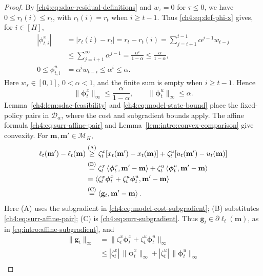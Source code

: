 \begin{proof}
By \eqref{ch4:eq:sdac-residual-definitions} and $w_\tau=0$ for $\tau\le0$,
we have $0\le r_t(i)\le r_t$, with $r_t(i)=r_t$ when $i\ge t-1$.
Thus \eqref{ch4:eq:def-phi-x} gives, for $i\in[H]$,
\[
\begin{aligned}
|\phi_{t,i}^x|
 &=|r_t(i)-r_t|=r_t-r_t(i)
   =\sum_{j=i+1}^{t-1}\alpha^{j-1}w_{t-j}\\
 &\le\sum_{j=i+1}^{\infty}\alpha^{j-1}
   =\frac{\alpha^i}{1-\alpha}
   \le\frac{\alpha}{1-\alpha},\\
0\le\phi_{t,i}^u&=\alpha^i w_{t-i}\le\alpha^i\le\alpha.
\end{aligned}
\]
Here $w_s\in[0,1]$, $0<\alpha<1$, and the finite sum is empty
when $i\ge t-1$. Hence
\begin{equation}
\label{ch4:eq:surr-coefficient-norms}
\|\boldsymbol{\phi}_t^x\|_\infty\le\frac{\alpha}{1-\alpha},
\qquad
\|\boldsymbol{\phi}_t^u\|_\infty\le\alpha.
\end{equation}
Lemma~\ref{ch4:lem:sdac-feasibility} and
\eqref{ch4:eq:model-state-bound} place the fixed-policy pairs in
$\mathcal D_\alpha$, where the cost and subgradient bounds apply.
The affine formula \eqref{ch4:eq:surr-affine-pair} and
Lemma~\ref{lem:intro:convex-comparison} give convexity. For
$\mathbf m,\mathbf m'\in\mathcal M_H$,
\[
\begin{aligned}
\ell_t(\mathbf m')-\ell_t(\mathbf m)
&\overset{\mathrm{(A)}}{\ge}
 \zeta_t^x[x_t(\mathbf m')-x_t(\mathbf m)]
 +\zeta_t^u[u_t(\mathbf m')-u_t(\mathbf m)]\\
&\overset{\mathrm{(B)}}{=}
 \zeta_t^x\left\langle \boldsymbol\phi_t^x,\mathbf m'-\mathbf m \right\rangle
 +\zeta_t^u\left\langle \boldsymbol\phi_t^u,\mathbf m'-\mathbf m \right\rangle\\
&=\left\langle \zeta_t^x\boldsymbol\phi_t^x+\zeta_t^u\boldsymbol\phi_t^u,\mathbf m'-\mathbf m \right\rangle\\
&\overset{\mathrm{(C)}}{=}\left\langle \mathbf g_t,\mathbf m'-\mathbf m \right\rangle.
\end{aligned}
\]
Here (A) uses the subgradient in \eqref{ch4:eq:model-cost-subgradient};
(B) substitutes \eqref{ch4:eq:surr-affine-pair};
(C) is \eqref{ch4:eq:surr-subgradient}.
Thus $\mathbf g_t\in\partial\ell_t(\mathbf m)$, as in
\eqref{eq:intro:affine-subgradient}, and
\[
\begin{aligned}
\|\mathbf g_t\|_\infty
&=\|\zeta_t^x\boldsymbol\phi_t^x+\zeta_t^u\boldsymbol\phi_t^u\|_\infty\\
&\le |\zeta_t^x|\,\|\boldsymbol\phi_t^x\|_\infty
     +|\zeta_t^u|\,\|\boldsymbol\phi_t^u\|_\infty\\

\end{aligned}\]
\end{proof}
